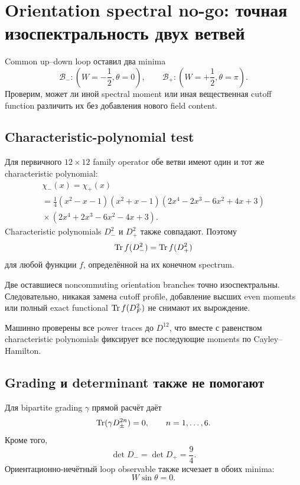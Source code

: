 \chapter{Orientation spectral no-go: точная изоспектральность двух ветвей}

Common up--down loop оставил два minima
\begin{equation}
 \mathcal B_-:
 \left(W=-\frac12,\theta=0\right),
 \qquad
 \mathcal B_+:
 \left(W=+\frac12,\theta=\pi\right).
\end{equation}
Проверим, может ли иной spectral moment или иная вещественная cutoff function
различить их без добавления нового field content.

\section{Characteristic-polynomial test}

Для первичного \(12\times12\) family operator обе ветви имеют один и тот же
characteristic polynomial:
\begin{multline}
 \chi_-(x)=\chi_+(x)\\
 =
 \frac14
 (x^2-x-1)(x^2+x-1)
 (2x^4-2x^3-6x^2+4x+3)\\
 {}\times
 (2x^4+2x^3-6x^2-4x+3).
\end{multline}
Characteristic polynomials \(D_-^2\) и \(D_+^2\) также совпадают. Поэтому
\begin{equation}
 \operatorname{Tr} f(D_-^2)=\operatorname{Tr} f(D_+^2)
\end{equation}
для любой функции \(f\), определённой на их конечном spectrum.

\begin{theorem}
Две оставшиеся noncommuting orientation branches точно изоспектральны.
Следовательно, никакая замена cutoff profile, добавление высших even moments
или полный exact functional \(\operatorname{Tr} f(D_F^2)\) не снимают их вырождение.
\end{theorem}

Машинно проверены все power traces до \(D^{12}\), что вместе с равенством
characteristic polynomials фиксирует все последующие moments по
Cayley--Hamilton.

\section{Grading и determinant также не помогают}

Для bipartite grading \(\gamma\) прямой расчёт даёт
\begin{equation}
 \operatorname{Tr}(\gamma D_\pm^{2n})=0,
 \qquad n=1,\ldots,6.
\end{equation}
Кроме того,
\begin{equation}
 \det D_-=\det D_+=\frac94.
\end{equation}
Ориентационно-нечётный loop observable также исчезает в обоих minima:
\begin{equation}
 W\sin\theta=0.
\end{equation}

